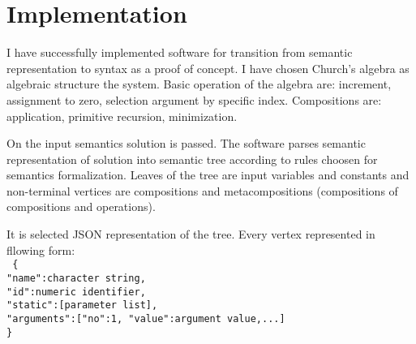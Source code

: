 \section{Implementation}
I have successfully implemented software for transition from semantic representation to syntax as a proof of concept. I have chosen Church's algebra as algebraic structure the system. Basic operation of the algebra are: increment, assignment to zero, selection argument by specific index. Compositions are: application, primitive recursion, minimization.

On the input semantics solution is passed. The software parses semantic representation of solution into semantic tree according to rules choosen for semantics formalization. Leaves of the tree are input variables and constants and non-terminal vertices are compositions and metacompositions (compositions of compositions and operations).

It is selected JSON representation of the tree. Every vertex represented in fllowing form:\\
\texttt{
\{\\
\indent "name":character string,\\
\indent "id":numeric identifier,\\
\indent "static":[parameter list],\\
\indent "arguments":[{"no":1, "value":argument value},...]\\
\}\\
}

